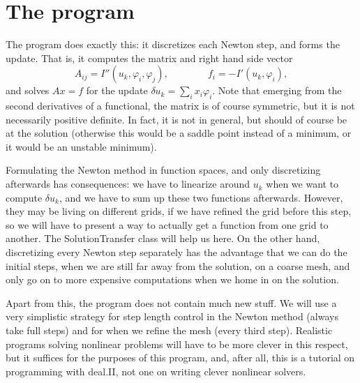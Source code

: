 \documentclass{article}
\begin{document}
\section{The program}

The program does exactly this: it discretizes each Newton step, and forms the
update. That is, it computes the matrix and right hand side vector
\begin{equation*}
  A_{ij} = I''(u_k, \varphi_i, \varphi_j),
  \qquad\qquad 
  f_i = -I'(u_k, \varphi_i),
\end{equation*}
and solves $Ax=f$ for the update $\delta u_k=\sum_i x_i \varphi_i$. Note that
emerging from the second derivatives of a functional, the matrix is of course
symmetric, but it is not necessarily positive definite. In fact, it is not in
general, but should of course be at the solution (otherwise this would be a
saddle point instead of a minimum, or it would be an unstable minimum).

Formulating the Newton method in function spaces, and only discretizing
afterwards has consequences: we have to linearize around $u_k$ when we want to
compute $\delta u_k$, and we have to sum up these two functions afterwards.
However, they may be living on different grids, if we have refined the grid
before this step, so we will have to present a way to actually get a function
from one grid to another. The \textrm{SolutionTransfer} class will help us
here. On the other hand, discretizing every Newton step separately has the
advantage that we can do the initial steps, when we are still far away from
the solution, on a coarse mesh, and only go on to more expensive computations
when we home in on the solution.

Apart from this, the program does not contain much new stuff. We will use a
very simplistic strategy for step length control in the Newton method (always
take full steps) and for when we refine the mesh (every third step). Realistic
programs solving nonlinear problems will have to be more clever in this
respect, but it suffices for the purposes of this program, and, after all,
this is a tutorial on programming with \textrm{deal.II}, not one on writing
clever nonlinear solvers.
\end{document}

